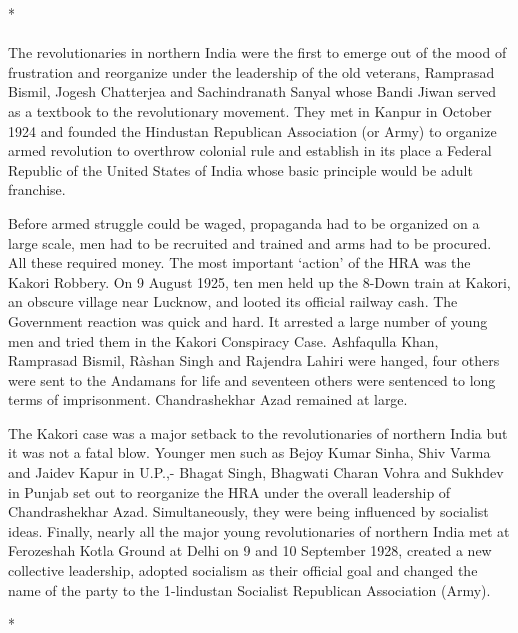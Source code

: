 \begin{center}*\end{center}

\paragraph*{}


The revolutionaries in northern India were the first to emerge out of the mood of frustration and reorganize under the leadership of the old veterans, Ramprasad Bismil, Jogesh Chatterjea and Sachindranath Sanyal whose Bandi Jiwan served as a textbook to the revolutionary movement. They met in Kanpur in October 1924 and founded the Hindustan Republican Association (or Army) to organize armed revolution to overthrow colonial rule and establish in its place a Federal Republic of the United States of India whose basic principle would be adult franchise.

Before armed struggle could be waged, propaganda had to be organized on a large scale, men had to be recruited and trained and arms had to be procured. All these required money. The most important `action' of the HRA was the Kakori Robbery. On 9 August 1925, ten men held up the 8-Down train at Kakori, an obscure village near Lucknow, and looted its official railway cash. The Government reaction was quick and hard. It arrested a large number of young men and tried them in the Kakori Conspiracy Case. Ashfaqulla Khan, Ramprasad Bismil, Ràshan Singh and Rajendra Lahiri were hanged, four others were sent to the Andamans for life and seventeen others were sentenced to long terms of imprisonment. Chandrashekhar Azad remained at large.

The Kakori case was a major setback to the revolutionaries of northern India but it was not a fatal blow. Younger men such as Bejoy Kumar Sinha, Shiv Varma and Jaidev Kapur in U.P.,- Bhagat Singh, Bhagwati Charan Vohra and Sukhdev in Punjab set out to reorganize the HRA under the overall leadership of Chandrashekhar Azad. Simultaneously, they were being influenced by socialist ideas. Finally, nearly all the major young revolutionaries of northern India met at Ferozeshah Kotla Ground at Delhi on 9 and 10 September 1928, created a new collective leadership, adopted socialism as their official goal and changed the name of the party to the 1-lindustan Socialist Republican Association (Army).

\begin{center}*\end{center}

